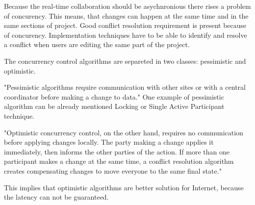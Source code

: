 \documentclass[12pt,oneside]{fithesis2}
\begin{document}
\par Because the real-time collaboration should be asychnronious there rises a problem of concurency. This means, that changes can happen at the same time and in the same sections of project. Good conflict resolution requirement is present because of concurency. Implementation techniques have to be able to identify and resolve a conflict when users are editing the same part of the project. \par The concurrency control algorithms are separeted in two classes: pessimistic and optimistic. \par "Pessimistic algorithms require communication with other sites or with a central coordinator before making a change to data." \cite{Jupiter} One example of pessimistic algorithm can be already mentioned Locking or Single Active Participant technique. \par "Optimistic concurrency control, on the other hand, requires no communication before applying changes locally. The party making a change applies it immediately, then informs the other parties of the action. If more than one participant makes a change at the same time, a conflict resolution algorithm creates compensating changes to move everyone to the same final state." \cite{Jupiter} \par This implies that optimistic algorithms are better solution for Internet, because the latency can not be guaranteed. 
\end{document}
